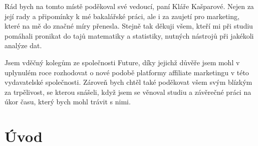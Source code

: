 \documentclass[12pt,oneside,openany]{fithesis}
\makeatletter
\def\cleardoublepage{\clearpage\if@twoside \ifodd\c@page\else
        \thispagestyle{empty}
        \hbox{}\newpage\if@twocolumn\hbox{}\newpage\fi\fi\fi}
\makeatother
\begin{document}
\SkipTocEntry\begin{ThesisThanks} %

\vspace{20mm}

Rád bych na tomto místě poděkoval své vedoucí, paní Kláře Kašparové. 
Nejen za její rady a připomínky k mé bakalářské práci, ale i za 
zaujetí pro marketing, které na mě do značné míry přenesla. Stejně tak 
děkuji všem, kteří mi při studiu pomáhali pronikat do tajů matematiky a 
statistiky, nutných nástrojů při jakékoli analýze dat. 

Jsem vděčný kolegům ze společnosti Future, díky jejichž důvěře
jsem mohl v uplynulém roce rozhodovat o nové podobě platformy affiliate
marketingu v této vydavatelské společnosti. Zároveň bych 
chtěl také poděkovat všem svým blízkým za trpělivost, se kterou snášeli, 
když jsem se věnoval studiu a závěrečné práci na úkor času, který 
bych mohl trávit s nimi.

\end{ThesisThanks}
\normalsize







\tableofcontents %

\MainMatter


\cleardoublepage
\chapter*{Úvod}
{}
\end{document}
